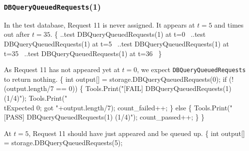 \documentclass{article}
\def\nwendcode{\endtrivlist \endgroup}
\let\nwdocspar=\par
\begin{document}
\subsubsection{{\tt{}DBQueryQueuedRequests}(1)}
In the test database, Request 11 is never assigned. It appears
at $t=5$ and times out after $t=35$.
\nwenddocs{}\endmoddef{}
\{
  \LA{}..test \code{}DBQueryQueuedRequests\edoc{}(1) at t=0~{\nwtagstyle{}}\RA{}
  \LA{}..test \code{}DBQueryQueuedRequests\edoc{}(1) at t=5~{\nwtagstyle{}}\RA{}
  \LA{}..test \code{}DBQueryQueuedRequests\edoc{}(1) at t=35~{\nwtagstyle{}}\RA{}
  \LA{}..test \code{}DBQueryQueuedRequests\edoc{}(1) at t=36~{\nwtagstyle{}}\RA{}
\}
\nwendcode{}\nwdocspar
As Request 11 has not appeared yet at $t=0$, we expect
{\tt{}DBQueryQueuedRequests} to return nothing.
\nwenddocs{}\endmoddef{}
\{
  int output[] = storage.DBQueryQueuedRequests(0);
  if (!(output.length/7 == 0)) \{
    Tools.Print("[FAIL] DBQueryQueuedRequests(1) (1/4)");
    Tools.Print("\\tExpected 0; got "+output.length/7);
    count_failed++;
  \} else \{
    Tools.Print("[PASS] DBQueryQueuedRequests(1) (1/4)");
    count_passed++;
  \}
\}
\nwendcode{}\nwdocspar
At $t=5$, Request 11 should have just appeared and be queued up.
\nwenddocs{}\endmoddef{}
\{
  int output[] = storage.DBQueryQueuedRequests(5);
\end{document}
